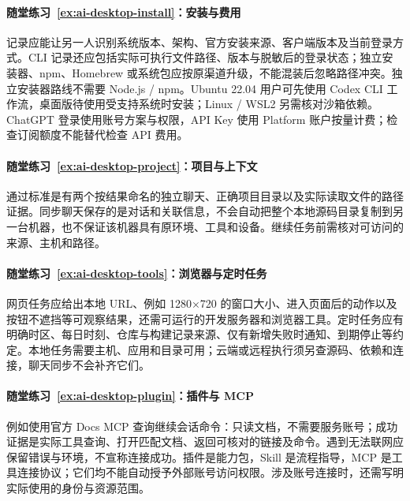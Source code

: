 \paragraph*{随堂练习~\ref{ex:ai-desktop-install}：安装与费用}
\begin{solution}
记录应能让另一人识别系统版本、架构、官方安装来源、客户端版本及当前登录方式。CLI 记录还应包括实际可执行文件路径、版本与脱敏后的登录状态；独立安装器、npm、Homebrew 或系统包应按原渠道升级，不能混装后忽略路径冲突。独立安装器路线不需要 Node.js / npm。Ubuntu 22.04 用户可先使用 Codex CLI 工作流，桌面版待使用受支持系统时安装；Linux / WSL2 另需核对沙箱依赖。ChatGPT 登录使用账号方案与权限，API Key 使用 Platform 账户按量计费；检查订阅额度不能替代检查 API 费用。
\end{solution}

\paragraph*{随堂练习~\ref{ex:ai-desktop-project}：项目与上下文}
\begin{solution}
通过标准是有两个按结果命名的独立聊天、正确项目目录以及实际读取文件的路径证据。同步聊天保存的是对话和关联信息，不会自动把整个本地源码目录复制到另一台机器，也不保证该机器具有原环境、工具和设备。继续任务前需核对可访问的来源、主机和路径。
\end{solution}

\paragraph*{随堂练习~\ref{ex:ai-desktop-tools}：浏览器与定时任务}
\begin{solution}
网页任务应给出本地 URL、例如 1280×720 的窗口大小、进入页面后的动作以及按钮不遮挡等可观察结果，还需可运行的开发服务器和浏览器工具。定时任务应有明确时区、每日时刻、仓库与构建记录来源、仅有新增失败时通知、到期停止等约定。本地任务需要主机、应用和目录可用；云端或远程执行须另查源码、依赖和连接，聊天同步不会补齐它们。
\end{solution}

\paragraph*{随堂练习~\ref{ex:ai-desktop-plugin}：插件与 MCP}
\begin{solution}
例如使用官方 Docs MCP 查询继续会话命令：只读文档，不需要服务账号；成功证据是实际工具查询、打开匹配文档、返回可核对的链接及命令。遇到无法联网应保留错误与环境，不宣称连接成功。插件是能力包，Skill 是流程指导，MCP 是工具连接协议；它们均不能自动授予外部账号访问权限。涉及账号连接时，还需写明实际使用的身份与资源范围。
\end{solution}

